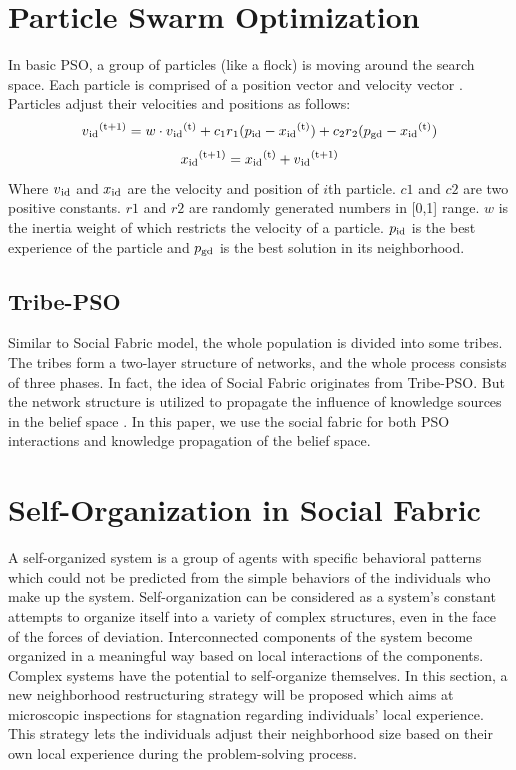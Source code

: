 \documentclass{llncs}
\begin{document}
\section{Particle Swarm Optimization}
In basic PSO, a group of particles (like a flock) is moving around the search space. Each particle is comprised of a position vector and velocity vector \cite{bratton2007defining}. Particles adjust their velocities and positions as follows:
\begin{equation}
	v\textsubscript{id}\textsuperscript{(t+1)}=w\cdot v\textsubscript{id}\textsuperscript{(t)} + c\textsubscript{1}r\textsubscript{1}(p\textsubscript{id}-x\textsubscript{id}\textsuperscript{(t)})+c\textsubscript{2}r\textsubscript{2}(p\textsubscript{gd}-x\textsubscript{id}\textsuperscript{(t)})
\end{equation}
\begin{equation}
	x\textsubscript{id}\textsuperscript{(t+1)}=x\textsubscript{id}\textsuperscript{(t)}+v\textsubscript{id}\textsuperscript{(t+1)}
\end{equation}
Where $v\textsubscript{id}$ and $x\textsubscript{id}$ are the velocity and position of $i$th particle. $c1$ and $c2$ are two positive constants. $r1$ and $r2$ are randomly generated numbers in [0,1] range. $w$ is the inertia weight of which restricts the velocity of a particle. $p\textsubscript{id}$ is the best experience of the particle and $p\textsubscript{gd}$ is the best solution in its neighborhood.
\subsection{Tribe-PSO}
Similar to Social Fabric model, the whole population is divided into some tribes.  The tribes form a two-layer structure of networks, and the whole process consists of three phases. In fact, the idea of Social Fabric originates from Tribe-PSO. But the network structure is utilized to propagate the influence of knowledge sources in the belief space \cite{chen2006tribe}. In this paper, we use the social fabric for both PSO interactions and knowledge propagation of the belief space.
\section{Self-Organization in Social Fabric}
A self-organized system is a group of agents with specific behavioral patterns which could not be predicted from the simple behaviors of the individuals who make up the system. Self-organization can be considered as a system's constant attempts to organize itself into a variety of complex structures, even in the face of the forces of deviation. Interconnected components of the system become organized in a meaningful way based on local interactions of the components. Complex systems have the potential to self-organize themselves.\newline
In this section, a new neighborhood restructuring strategy will be proposed which aims at microscopic inspections for stagnation regarding individuals' local experience. This strategy lets the individuals adjust their neighborhood size based on their own local experience during the problem-solving process. %
\end{document}

